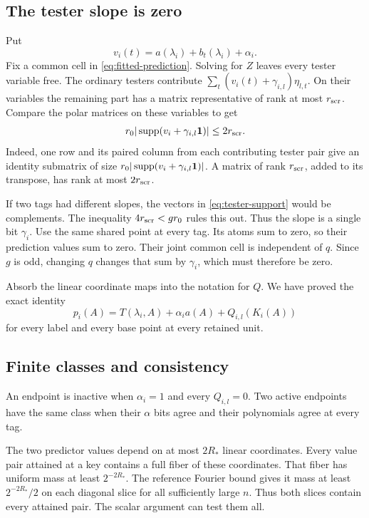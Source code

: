 \subsection{The tester slope is zero}

Put
\[
 v_i(t)=a(\lambda_i)+b_t(\lambda_i)+\alpha_i.
\]
Fix a common cell in \eqref{eq:fitted-prediction}. Solving for \(Z\)
leaves every tester variable free. The ordinary testers contribute
\(\sum_t(v_i(t)+\gamma_{i,l})\eta_{l,t}\). On their variables the
remaining part has a matrix representative of rank at most
\(r_{\rm scr}\). Compare the polar matrices on these variables to get
\begin{equation}\label{eq:tester-support}
 r_0|\operatorname{supp}(v_i+\gamma_{i,l}\mathbf1)|\le2r_{\rm scr}.
\end{equation}
Indeed, one row and its paired column from each contributing tester
pair give an identity submatrix of size \(r_0|\operatorname{supp}(v_i+\gamma_{i,l}\mathbf1)|\).
A matrix of rank \(r_{\rm scr}\), added to its transpose, has rank at
most \(2r_{\rm scr}\).

If two tags had different slopes, the vectors in
\eqref{eq:tester-support} would be complements. The inequality
\(4r_{\rm scr}<gr_0\) rules this out. Thus the slope is a single bit
\(\gamma_i\). Use the same shared point at every tag. Its atoms sum to
zero, so their prediction values sum to zero. Their joint common cell
is independent of \(q\). Since \(g\) is odd, changing \(q\) changes
that sum by \(\gamma_i\), which must therefore be zero.

Absorb the linear coordinate maps into the notation for \(Q\). We have
proved the exact identity
\begin{equation}\label{eq:exact-quadratic-prediction}
 p_i(A)=T(\lambda_i,A)+\alpha_i a(A)+Q_{i,l}(K_i(A))
\end{equation}
for every label and every base point at every retained unit.

\subsection{Finite classes and consistency}

An endpoint is inactive
when \(\alpha_i=1\) and every \(Q_{i,l}=0\). Two active endpoints have
the same class when their \(\alpha\) bits agree and their polynomials agree at every tag.

The two predictor values depend on at most \(2R_*\) linear coordinates.
Every value pair attained at a key contains a full fiber of these
coordinates. That fiber has uniform mass at least \(2^{-2R_*}\).
The reference Fourier bound gives it mass at least \(2^{-2R_*}/2\)
on each diagonal slice for all sufficiently large \(n\). Thus both
slices contain every attained pair. The scalar argument can test them all.

